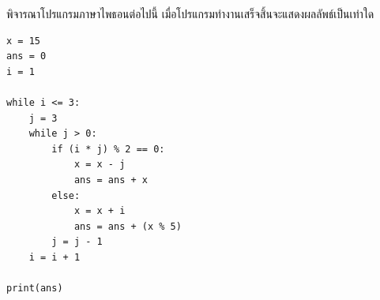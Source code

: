 \question พิจารณาโปรแกรมภาษาไพธอนต่อไปนี้ เมื่อโปรแกรมทำงานเสร็จสิ้นจะแสดงผลลัพธ์เป็นเท่าใด
\begin{verbatim}
x = 15
ans = 0
i = 1

while i <= 3:
    j = 3
    while j > 0:
        if (i * j) % 2 == 0:
            x = x - j
            ans = ans + x
        else:
            x = x + i
            ans = ans + (x % 5)
        j = j - 1
    i = i + 1

print(ans)
\end{verbatim}
